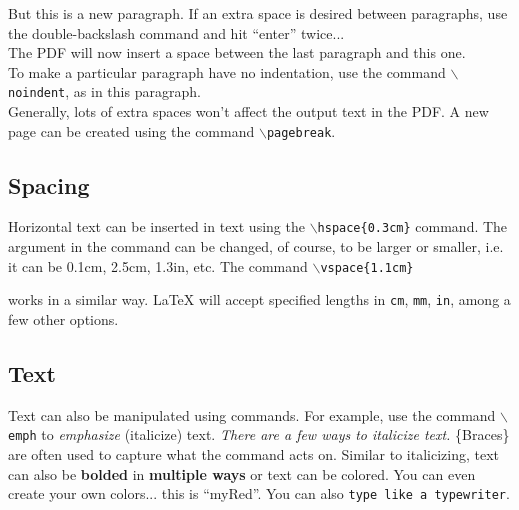 \documentclass[11pt]{article} %
\begin{document}
But this is a new paragraph. If an extra space is desired between paragraphs, use the double-backslash command and hit ``enter'' twice... \\

The PDF will now insert a space between the last paragraph and this one. \\

\noindent To make a particular paragraph have no indentation, use the command \texttt{$\backslash$noindent}, as in this paragraph. \\




Generally, lots of extra spaces won't           affect      		 	    the output text     in    the PDF. A new page can be created using the command \texttt{$\backslash$pagebreak}.

\pagebreak

\subsection{Spacing}
\label{spacing}

Horizontal text can be inserted in text using the \texttt{$\backslash$hspace\{0.3cm\}} \hspace{0.3cm} command. The argument in the command can be changed, of course, to be larger or smaller, i.e. it can be 0.1cm, 2.5cm, 1.3in, etc. The command \texttt{$\backslash$vspace\{1.1cm\}} \\
\vspace{1.1cm}

\noindent works in a similar way. LaTeX will accept specified lengths in \texttt{cm}, \texttt{mm}, \texttt{in}, among a few other options.

\subsection{Text}

Text can also be manipulated using commands. For example, use the command \texttt{$\backslash$emph} to \emph{emphasize} (italicize) text. {\em There are a few ways to italicize text.} \{Braces\} are often used to capture what the command acts on. Similar to italicizing, text can also be \textbf{bolded} in {\bfseries multiple ways} or text can be {\color{red} colored}. You can even create your own colors...
{\color{myRed}this is ``myRed''}. %
You can also \texttt{type like a typewriter}. \\
\end{document}

